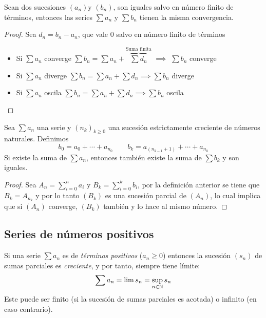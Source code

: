 \begin{prop}
	Sean dos sucesiones $(a_n)$y $(b_n)$, son iguales salvo en número finito de términos,
	entonces las series $\sum a_n$ y $\sum b_n$ tienen la misma convergencia.
\end{prop}

\begin{proof}
	Sea $d_n = b_n - a_n$, que vale 0 salvo en número finito de términos
	\begin{itemize}
		\item Si $\sum a_n$ converge \qquad $\sum b_n = \sum a_n +
		\overbrace{\sum d_n}^\text{Suma finita}$ $\implies$ $\sum b_n$ converge
		\item Si $\sum a_n$ diverge \qquad $\sum b_n = \sum a_n + \sum d_n
		\implies \sum b_n$ diverge
		\item Si $\sum a_n$ oscila \qquad $\sum b_n = \sum a_n + \sum d_n
		\implies \sum b_n$ oscila
	\end{itemize}
\end{proof}

\begin{prop}[Asociatividad]
	Sea $\sum a_n$ una serie y $(n_k)_{k \geq 0}$ una sucesión estrictamente creciente de
	números naturales. Definimos
	\[
		b_0 = a_0 + \cdots + a_{n_0} \qquad b_k = a_{(n_{k-1}+1)} + \cdots + a_{n_k}
	\]
	Si existe la suma de $\sum a_n$, entonces también existe la suma de $\sum b_k$
	y son iguales.
\end{prop}

\begin{proof}
	Sea $A_n = \sum\limits_{i=0}^{n} a_i$ y $B_k = \sum\limits_{i=0}^{k} b_i$, por la
	definición anterior se tiene que $B_k = A_{n_k}$ y por lo tanto $(B_k)$ es una sucesión
	parcial de $(A_n)$, lo cual implica que si $(A_n)$ converge, $(B_k)$ también
	y lo hace al mismo número.
\end{proof}


\subsection{Series de números positivos}

\begin{prop}
	Si una serie $\sum a_n$ es de \textit{términos positivos} ($a_n \geq 0$) entonces la
	sucesión $(s_n)$ de sumas parciales es \textit{creciente}, y por tanto, siempre tiene
	límite:
	\[
		\sum a_n = \lim s_n = \sup_{n \in \mathbb{N}} s_n
	\]
	Este puede ser finito (si la sucesión de sumas parciales es acotada) o infinito (en caso
	contrario).
\end{prop}

